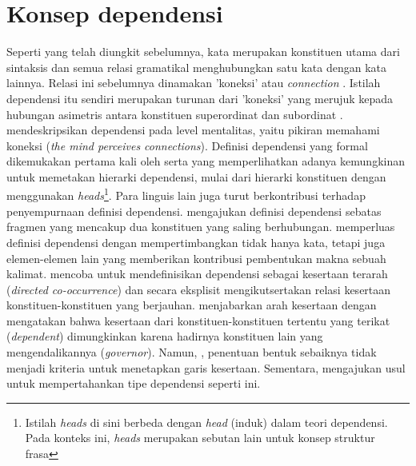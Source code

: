 \section{Konsep dependensi}
Seperti yang telah diungkit sebelumnya, kata merupakan konstituen utama dari sintaksis dan semua relasi gramatikal menghubungkan satu kata dengan kata lainnya. Relasi ini sebelumnya dinamakan 'koneksi' atau \textit{connection} \citep{tesniere1959elements}. Istilah dependensi itu sendiri merupakan turunan dari 'koneksi' yang merujuk kepada hubungan asimetris antara konstituen superordinat dan subordinat \citep{hudson1984word}. \cite{tesniere1959elements} mendeskripsikan dependensi pada level mentalitas, yaitu pikiran memahami koneksi (\textit{the mind perceives connections}). Definisi dependensi yang formal dikemukakan pertama kali oleh \cite{lecerf1960programme} serta \cite{gladkij1966lekcii} yang memperlihatkan adanya kemungkinan untuk memetakan hierarki dependensi, mulai dari hierarki konstituen dengan menggunakan \textit{heads}\footnote{Istilah \textit{heads} di sini berbeda dengan \textit{head} (induk) dalam teori dependensi. Pada konteks ini, \textit{heads} merupakan sebutan lain untuk konsep struktur frasa}. Para linguis lain juga turut berkontribusi terhadap penyempurnaan definisi dependensi. \cite{mel'vcuk1988dependency} mengajukan definisi dependensi sebatas fragmen yang mencakup dua konstituen yang saling berhubungan. \cite{garde1977ordre} memperluas definisi dependensi dengan mempertimbangkan tidak hanya kata, tetapi juga elemen-elemen lain yang memberikan kontribusi pembentukan makna sebuah kalimat. \cite{schubert1987metataxis} mencoba untuk mendefinisikan dependensi sebagai kesertaan terarah (\textit{directed co-occurrence}) dan secara eksplisit mengikutsertakan relasi kesertaan konstituen-konstituen yang berjauhan. \cite{schubert1987metataxis} menjabarkan arah kesertaan dengan mengatakan bahwa kesertaan dari konstituen-konstituen tertentu yang terikat (\textit{dependent}) dimungkinkan karena hadirnya konstituen lain yang mengendalikannya (\textit{governor}). Namun, \cite{schubert1987metataxis}, penentuan bentuk sebaiknya tidak menjadi kriteria untuk menetapkan garis kesertaan. Sementara, \cite{hudson1994discontinuous} mengajukan usul untuk mempertahankan tipe dependensi seperti ini.

